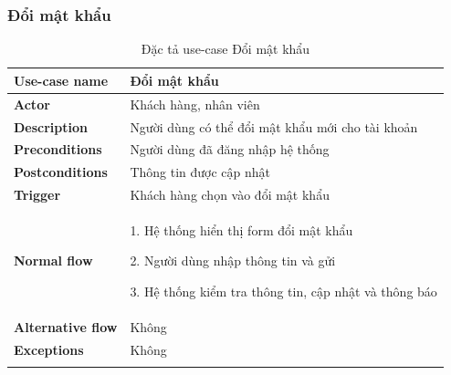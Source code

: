 \subsubsection{Đổi mật khẩu}
{
    \setlength\extrarowheight{6pt}
    \begin{longtable}{| p{} | p{} |}
        \hline
        \textbf{Use-case name}
         &
        Đổi mật khẩu
        \\
        \hline
        \textbf{Actor}
         &
        Khách hàng, nhân viên
        \\
        \hline
        \textbf{Description}
         &
        Người dùng có thể đổi mật khẩu mới cho tài khoản
        \\
        \hline
        \textbf{Preconditions}
         &
        Người dùng đã đăng nhập hệ thống
        \\
        \hline
        \textbf{Postconditions}
         &
        Thông tin được cập nhật
        \\
        \hline
        \textbf{Trigger}
         &
        Khách hàng chọn vào đổi mật khẩu
        \\
        \hline
        \begin{flushleft}
            \textbf{Normal flow}
        \end{flushleft}
         &
        1. Hệ thống hiển thị form đổi mật khẩu

        2. Người dùng nhập thông tin và gửi

        3. Hệ thống kiểm tra thông tin, cập nhật và thông báo
        \\
        \hline
        \textbf{Alternative flow}
         &
        Không
        \\
        \hline
        \textbf{Exceptions}
         &
        Không
        \\
        \hline
        \caption{Đặc tả use-case Đổi mật khẩu}
    \end{longtable}
}

\newpage

